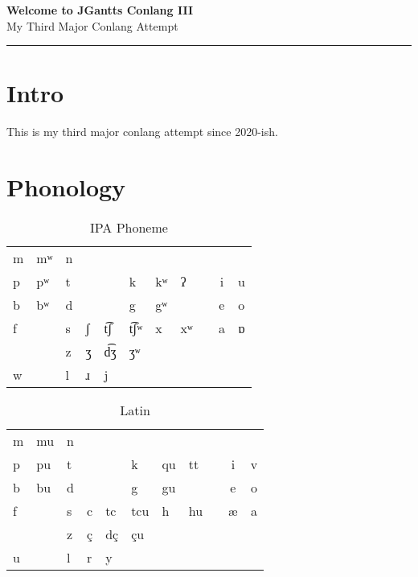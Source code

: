 \documentclass[11pt]{article}
\newcommand{\customtitle}[1]{
    \begin{center}
        \vspace*{2cm}
        {\Huge\bfseries\color{primary} #1}\\
        \vspace{0.5cm}
        {\Large My Third Major Conlang Attempt}\\
        \vspace{1cm}
    \end{center}
    \vspace{1cm}
    \hrule
    \vspace{1cm}
}
\begin{document}
\pagecolor{background}

\customtitle{Welcome to JGantts Conlang III}

\section{Intro}
This is my third major conlang attempt since 2020-ish.

\section{Phonology}

\begin{table}[H]
\begin{center}
\caption{IPA Phoneme}
\label{table-phonemes-ipa}
\setlength{\tabcolsep}{0.5em} %
\renewcommand{\arraystretch}{1} %
\begin{tabular}{l l l l l l l l l c c}
 m & mʷ & n & & & & & & & & \\
 p & pʷ & t & & & k & kʷ & ʔ & & i & u \\
 b & bʷ & d & & & g & gʷ & & & e & o \\
 f & & s & ʃ & t͡ʃ & t͡ʃʷ & x & xʷ & & a & ɒ \\
 & & z & ʒ & d͡ʒ & ʒʷ & & & & & \\
 w & & l & ɹ & j & & & & \\
\end{tabular}
\end{center}
\end{table}

\begin{table}[H]
\begin{center}
\caption{Latin}
\label{table-phonemes-latin}
\setlength{\tabcolsep}{0.5em} %
\renewcommand{\arraystretch}{1}
\begin{tabular}{l l l l l l l l l c c}
 m & mu & n & & & & & & & & \\
 p & pu & t & & & k & qu & tt & & i & v \\
 b & bu & d & & & g & gu & & & e & o \\
 f & & s & c & tc & tcu & h & hu & & æ & a \\
 & & z & ç & dç & çu & & & & & \\
 u & & l & r & y & & & & \\
\end{tabular}
\end{center}
\end{table}
\end{document}
